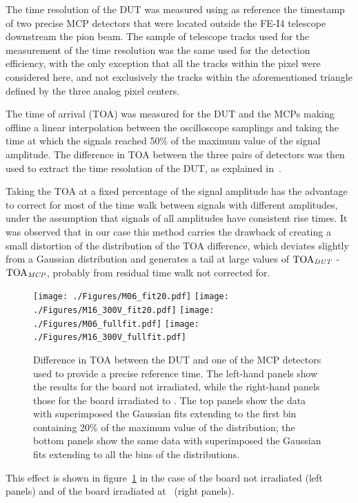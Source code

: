 		The time resolution of the DUT was measured using as reference the timestamp of two precise MCP detectors that were located outside the FE-I4 telescope downstream the pion beam. 
		The sample of telescope tracks used for the measurement of the time resolution was the same used for the detection efficiency, with the only exception that all the tracks within the pixel were considered here, and not exclusively the tracks within the aforementioned triangle defined by the three analog pixel centers. 

		The time of arrival (TOA) was measured for the DUT and the MCPs making offline a linear interpolation between the oscilloscope samplings and taking the time at which the signals reached 50\% of the maximum value of the signal amplitude.
		The difference in TOA between the three pairs of detectors was then used to extract the time resolution of the DUT, as explained in~\cite{Zambito_2023}. 

		Taking the TOA at a fixed percentage of the signal amplitude has the advantage to correct for most of the time walk between signals with different amplitudes, under the assumption that signals of all amplitudes have consistent rise times. 
		It was observed that in our case this method carries the drawback of creating a small distortion of the distribution of the TOA difference, which deviates slightly from a Gaussian distribution and generates a tail at large values of ${\rm TOA}_{\it DUT}$ - ${\rm TOA}_{\it MCP}$, probably from residual time walk not corrected for.
		\begin{figure}[!htb]
			\centering 
			\texttt{[image: ./Figures/M06\_fit20.pdf]}
			\texttt{[image: ./Figures/M16\_300V\_fit20.pdf]}
			\texttt{[image: ./Figures/M06\_fullfit.pdf]}
			\texttt{[image: ./Figures/M16\_300V\_fullfit.pdf]}
			\caption{\label{fig:toa} Difference in TOA between the DUT and one of the MCP detectors used to provide a precise reference time. The left-hand panels show the results for the board not irradiated, while the right-hand panels those for the board irradiated to \maxflu. The top panels show the data with superimposed the Gaussian fits extending to the first bin containing 20\% of the maximum value of the distribution; the bottom panels show the same data with superimposed the Gaussian fits extending to all the bins of the distributions.}
		\end{figure}
		This effect is shown in figure~\ref{fig:toa} in the case of the board not irradiated (left panels) and of the board irradiated at \maxflu~(right panels). 

